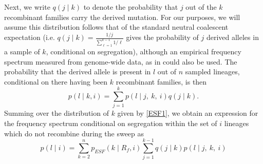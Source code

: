 \documentclass[a4paper,10pt]{article}
\newcommand{\gc}[1]{{\it \color{red} (#1)} }
\begin{document}
Next, we write $q\left(j \mid k\right)$ to denote the probability that $j$ out of the $k$ recombinant families carry the derived mutation. For our purposes, we will assume this distribution follows that of the standard neutral coalescent expectation (i.e. $q(j \mid k) = \frac{1/j}{\sum_{\ell=1}^{k-1}1/\ell}$ gives the probability of $j$ derived alleles in a sample of $k$, conditional on segregation), although an empirical frequency spectrum measured from genome-wide data, as in \cite{Nielsen:2005bla} could also be used. The probability that the derived allele is present in $l$ out of $n$ sampled lineages, conditional on there having been $k$ recombinant families, is then 
\begin{equation}
	p(l \mid k, i ) = \sum_{j=1}^k p(l \mid j,~k, ~i)q(j\mid k).
\end{equation}	
Summing over the distribution of $k$ given by \eqref{ESF1}, we obtain an expression for the frequency spectrum conditional on segregation within the set of $i$ lineages which do not recombine during the sweep as
\begin{equation}
	p(l \mid i) =  \sum_{k=2}^{n}  p_{ESF}(k \mid R_f,i)  \sum_{j=1}^{k-1} q(j\mid k) p(l \mid j,~k, ~i)
\end{equation}
%
\end{document}
